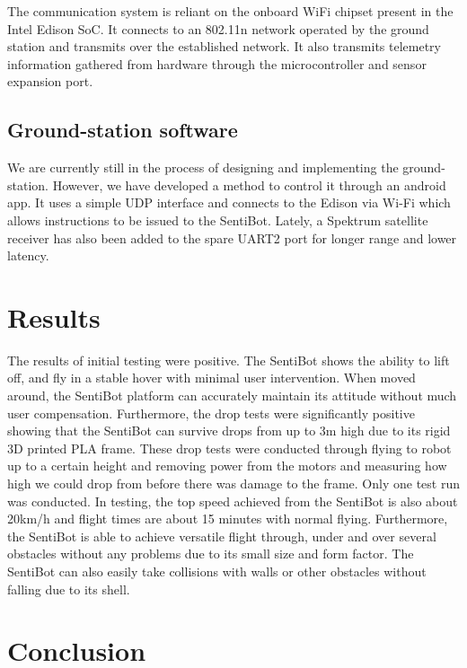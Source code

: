 \documentclass[12pt]{article}
\begin{document}
The communication system is reliant on the onboard WiFi chipset present in the Intel Edison SoC. It connects to an 802.11n network operated by the ground station and transmits over the established network. It also transmits telemetry information gathered from hardware through the microcontroller and sensor expansion port.

\subsection{Ground-station software}

We are currently still in the process of designing and implementing the ground-station. However, we have developed a method to control it through an android app. It uses a simple UDP interface and connects to the Edison via Wi-Fi which allows instructions to be issued to the SentiBot. Lately, a Spektrum satellite receiver has also been added to the spare UART2 port for longer range and lower latency. 

\section{Results}

The results of initial testing were positive. The SentiBot shows the ability to lift off, and fly in a stable hover with minimal user intervention. When moved around, the SentiBot platform can accurately maintain its attitude without much user compensation. Furthermore, the drop tests were significantly positive showing that the SentiBot can survive drops from up to 3m high due to its rigid 3D printed PLA frame. These drop tests were conducted through flying to robot up to a certain height and removing power from the motors and measuring how high we could drop from before there was damage to the frame. Only one test run was conducted. In testing, the top speed achieved from the SentiBot is also about 20km/h and flight times are about 15 minutes with normal flying. Furthermore, the SentiBot is able to achieve versatile flight through, under and over several obstacles without any problems due to its small size and form factor. The SentiBot can also easily take collisions with walls or other obstacles without falling due to its shell. 

\section{Conclusion}
\end{document}
